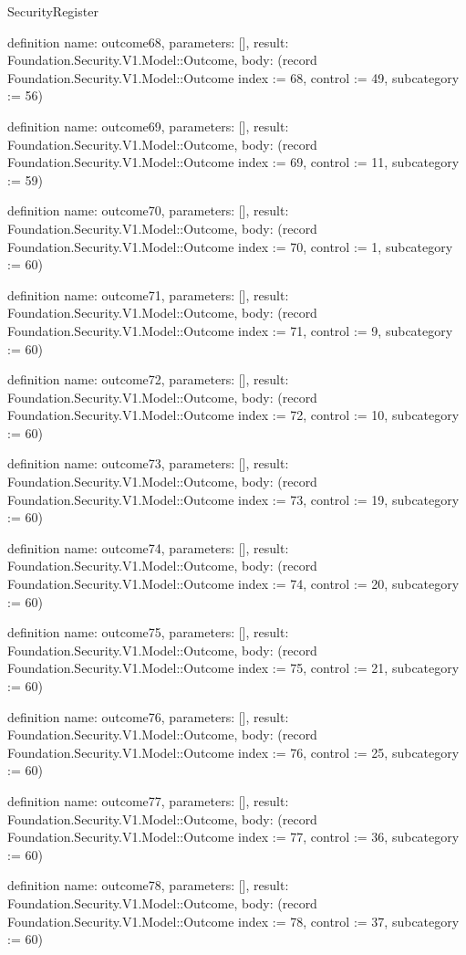 \begin{lexlean}{SecurityRegister}
\begin{semanticmodule}
definition{
  name: outcome68,
  parameters: [],
  result: Foundation.Security.V1.Model::Outcome,
  body: (record Foundation.Security.V1.Model::Outcome {index := 68, control := 49, subcategory := 56})
}

definition{
  name: outcome69,
  parameters: [],
  result: Foundation.Security.V1.Model::Outcome,
  body: (record Foundation.Security.V1.Model::Outcome {index := 69, control := 11, subcategory := 59})
}

definition{
  name: outcome70,
  parameters: [],
  result: Foundation.Security.V1.Model::Outcome,
  body: (record Foundation.Security.V1.Model::Outcome {index := 70, control := 1, subcategory := 60})
}

definition{
  name: outcome71,
  parameters: [],
  result: Foundation.Security.V1.Model::Outcome,
  body: (record Foundation.Security.V1.Model::Outcome {index := 71, control := 9, subcategory := 60})
}

definition{
  name: outcome72,
  parameters: [],
  result: Foundation.Security.V1.Model::Outcome,
  body: (record Foundation.Security.V1.Model::Outcome {index := 72, control := 10, subcategory := 60})
}

definition{
  name: outcome73,
  parameters: [],
  result: Foundation.Security.V1.Model::Outcome,
  body: (record Foundation.Security.V1.Model::Outcome {index := 73, control := 19, subcategory := 60})
}

definition{
  name: outcome74,
  parameters: [],
  result: Foundation.Security.V1.Model::Outcome,
  body: (record Foundation.Security.V1.Model::Outcome {index := 74, control := 20, subcategory := 60})
}

definition{
  name: outcome75,
  parameters: [],
  result: Foundation.Security.V1.Model::Outcome,
  body: (record Foundation.Security.V1.Model::Outcome {index := 75, control := 21, subcategory := 60})
}

definition{
  name: outcome76,
  parameters: [],
  result: Foundation.Security.V1.Model::Outcome,
  body: (record Foundation.Security.V1.Model::Outcome {index := 76, control := 25, subcategory := 60})
}

definition{
  name: outcome77,
  parameters: [],
  result: Foundation.Security.V1.Model::Outcome,
  body: (record Foundation.Security.V1.Model::Outcome {index := 77, control := 36, subcategory := 60})
}

definition{
  name: outcome78,
  parameters: [],
  result: Foundation.Security.V1.Model::Outcome,
  body: (record Foundation.Security.V1.Model::Outcome {index := 78, control := 37, subcategory := 60})
}


\end{semanticmodule}
\end{lexlean}
